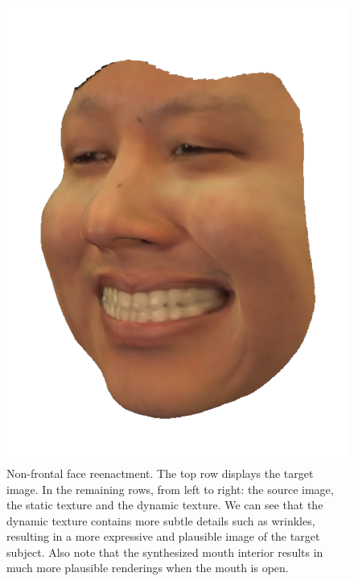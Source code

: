 \documentclass[10pt,twocolumn,letterpaper]{article}
\begin{document}
\begin{figure}[th]
\begin{center}
  \includegraphics[width=0.32\columnwidth]{figures/kylehao_transfer/dynamic_000066.png}
\end{center}
   \caption{Non-frontal face reenactment. The top row displays the target image. In the remaining rows, from left to right: the source image, the static texture and the dynamic texture. We can see that the dynamic texture contains more subtle details such as wrinkles, resulting in a more expressive and plausible image of the target subject. Also note that the synthesized mouth interior results in much more plausible renderings when the mouth is open.}
   \vspace{-0.05in}
\label{replaceres}
\end{figure}
\end{document}

